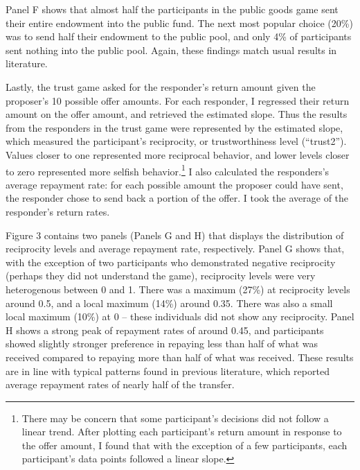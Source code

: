\documentclass[12pt]{article}
\begin{document}
Panel F shows that almost half the participants in the public goods game sent their entire endowment into the public fund. The next most popular choice (20\%) was to send half their endowment to the public pool, and only 4\% of participants sent nothing into the public pool. Again, these findings match usual results in literature.

Lastly, the trust game asked for the responder\rq s return amount given the proposer\rq s 10 possible offer amounts. For each responder, I regressed their return amount on the offer amount, and retrieved the estimated slope. Thus the results from the responders in the trust game were represented by the estimated slope, which measured the participant\rq s reciprocity, or trustworthiness level (``trust2''). Values closer to one represented more reciprocal behavior, and lower levels closer to zero represented more selfish behavior.\footnote{There may be concern that some participant\rq s decisions did not follow a linear trend. After plotting each participant\rq s return amount in response to the offer amount, I found that with the exception of a few participants, each participant\rq s data points followed a linear slope.} I also calculated the responders\rq s average repayment rate: for each possible amount the proposer could have sent, the responder chose to send back a portion of the offer. I took the average of the responder\rq s return rates.

Figure 3 contains two panels (Panels G and H) that displays the distribution of reciprocity levels and average repayment rate, respectively. Panel G shows that, with the exception of two participants who demonstrated negative reciprocity (perhaps they did not understand the game), reciprocity levels were very heterogenous between 0 and 1. There was a maximum (27\%) at reciprocity levels around 0.5, and a local maximum (14\%) around 0.35. There was also a small local maximum (10\%) at 0 -- these individuals did not show any reciprocity. Panel H shows a strong peak of repayment rates of around 0.45, and participants showed slightly stronger preference in repaying less than half of what was received compared to repaying more than half of what was received. These results are in line with typical patterns found in previous literature, which reported average repayment rates of nearly half of the transfer.
\end{document}
